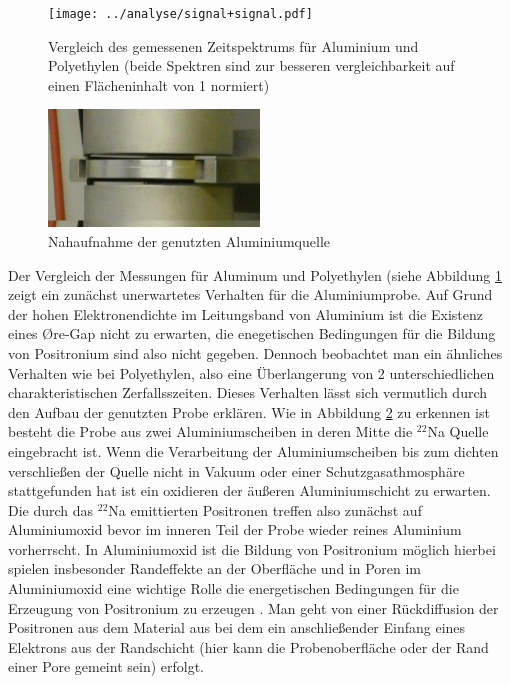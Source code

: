 \documentclass[a4paper,12pt]{article}
\begin{document}
\begin{figure}
	\texttt{[image: ../analyse/signal+signal.pdf]}
	\caption{Vergleich des gemessenen Zeitspektrums für Aluminium und Polyethylen (beide Spektren sind zur besseren vergleichbarkeit auf einen Flächeninhalt von 1 normiert) }
	\label{fig:compare_signal}
\end{figure}
\begin{figure}
	\centering
	\includegraphics[width=0.5\textwidth]{../pictures/quelle_nah.jpg}
	\caption{Nahaufnahme der genutzten Aluminiumquelle }
	\label{fig:quelle_nah}
\end{figure}
Der Vergleich der Messungen für Aluminum und Polyethylen (siehe Abbildung \ref{fig:compare_signal}  zeigt ein zunächst unerwartetes Verhalten für 
die Aluminiumprobe. Auf Grund der hohen Elektronendichte im Leitungsband von Aluminium ist die Existenz eines Øre-Gap nicht zu erwarten, die 
enegetischen Bedingungen für die Bildung von Positronium sind also nicht gegeben. Dennoch beobachtet man ein ähnliches Verhalten wie bei 
Polyethylen, also eine Überlangerung von 2 unterschiedlichen charakteristischen Zerfallsszeiten. Dieses Verhalten lässt sich vermutlich durch
den Aufbau der genutzten Probe erklären. Wie in Abbildung \ref{fig:quelle_nah} zu erkennen ist besteht die Probe aus zwei Aluminiumscheiben
in deren Mitte die $^{22}$Na Quelle eingebracht ist. Wenn die Verarbeitung der Aluminiumscheiben bis zum dichten verschließen der Quelle nicht
in Vakuum oder einer Schutzgasathmosphäre stattgefunden hat ist ein oxidieren der äußeren Aluminiumschicht zu erwarten. Die durch das $^{22}$Na
emittierten Positronen treffen also zunächst auf Aluminiumoxid bevor im inneren Teil der Probe wieder reines Aluminium vorherrscht. In Aluminiumoxid
ist die Bildung von Positronium möglich \cite{PhysRevB.70.115410} hierbei spielen insbesonder Randeffekte an der Oberfläche und in Poren im 
Aluminiumoxid eine wichtige Rolle die energetischen Bedingungen für die Erzeugung von Positronium zu erzeugen \cite{phd_trezzi}. Man geht von 
einer Rückdiffusion der Positronen aus dem Material aus bei dem ein anschließender Einfang eines Elektrons aus der Randschicht 
(hier kann die Probenoberfläche oder der Rand einer Pore gemeint sein) erfolgt.  
\end{document}
